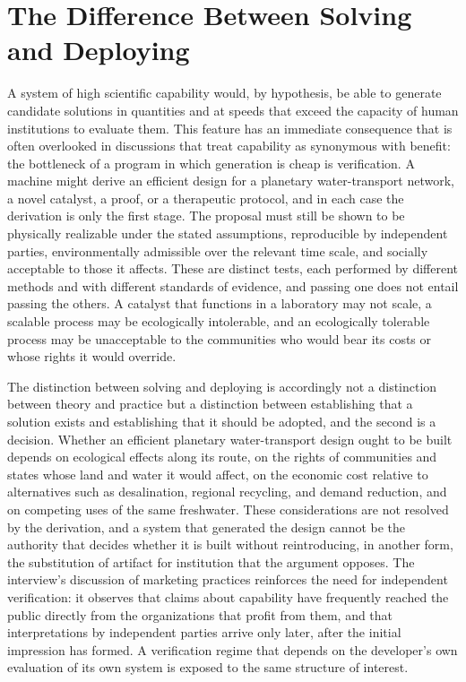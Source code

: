 \chapter{The Difference Between Solving and Deploying}
\label{ch:09}

A system of high scientific capability would, by hypothesis, be able to generate candidate solutions in quantities and at speeds that exceed the capacity of human institutions to evaluate them. This feature has an immediate consequence that is often overlooked in discussions that treat capability as synonymous with benefit: the bottleneck of a program in which generation is cheap is verification. A machine might derive an efficient design for a planetary water-transport network, a novel catalyst, a proof, or a therapeutic protocol, and in each case the derivation is only the first stage. The proposal must still be shown to be physically realizable under the stated assumptions, reproducible by independent parties, environmentally admissible over the relevant time scale, and socially acceptable to those it affects. These are distinct tests, each performed by different methods and with different standards of evidence, and passing one does not entail passing the others. A catalyst that functions in a laboratory may not scale, a scalable process may be ecologically intolerable, and an ecologically tolerable process may be unacceptable to the communities who would bear its costs or whose rights it would override.

The distinction between solving and deploying is accordingly not a distinction between theory and practice but a distinction between establishing that a solution exists and establishing that it should be adopted, and the second is a decision. Whether an efficient planetary water-transport design ought to be built depends on ecological effects along its route, on the rights of communities and states whose land and water it would affect, on the economic cost relative to alternatives such as desalination, regional recycling, and demand reduction, and on competing uses of the same freshwater. These considerations are not resolved by the derivation, and a system that generated the design cannot be the authority that decides whether it is built without reintroducing, in another form, the substitution of artifact for institution that the argument opposes. The interview's discussion of marketing practices reinforces the need for independent verification: it observes that claims about capability have frequently reached the public directly from the organizations that profit from them, and that interpretations by independent parties arrive only later, after the initial impression has formed. A verification regime that depends on the developer's own evaluation of its own system is exposed to the same structure of interest.

